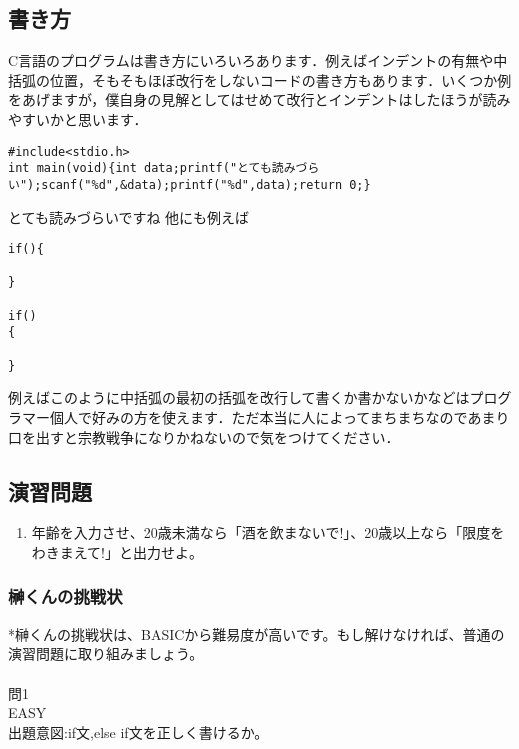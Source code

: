 \documentclass[a4j,titlepage,dvipdfmx]{jsarticle}   %
\begin{document}
\subsection{書き方}
C言語のプログラムは書き方にいろいろあります．例えばインデントの有無や中括弧の位置，そもそもほぼ改行をしないコードの書き方もあります．いくつか例をあげますが，僕自身の見解としてはせめて改行とインデントはしたほうが読みやすいかと思います．
\begin{lstlisting}
#include<stdio.h>
int main(void){int data;printf("とても読みづらい");scanf("%d",&data);printf("%d",data);return 0;}
\end{lstlisting}
とても読みづらいですね
他にも例えば
\begin{lstlisting}
if(){

}

if()
{

}
\end{lstlisting}
例えばこのように中括弧の最初の括弧を改行して書くか書かないかなどはプログラマー個人で好みの方を使えます．ただ本当に人によってまちまちなのであまり口を出すと宗教戦争になりかねないので気をつけてください．

\subsection{演習問題}
\begin{enumerate}
	\item 年齢を入力させ、20歳未満なら「酒を飲まないで!」、20歳以上なら「限度をわきまえて!」と出力せよ。
\end{enumerate}
\subsubsection{榊くんの挑戦状}
*榊くんの挑戦状は、BASICから難易度が高いです。もし解けなければ、普通の演習問題に取り組みましょう。\\
\\
問1\\
EASY\\
出題意図:if文,else if文を正しく書けるか。\\
\end{document}

